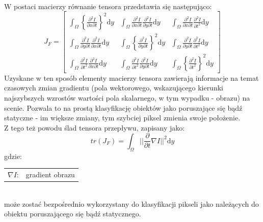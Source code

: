 \paragraph{}
W postaci macierzy równanie tensora przedstawia się następująco:
\begin{equation}
\label{eq:FT}
J_{F} =
\begin{bmatrix}
%
\int_\Omega \left\{\frac{\partial^2I}{\partial x\partial t}\right\}^2 \mathrm{d}y   &
%
\int_\Omega \frac{\partial^2I}{\partial x\partial t} \frac{\partial^2I}{\partial y\partial t} \mathrm{d}y  &
%
\int_\Omega \frac{\partial^2I}{\partial x\partial t} \frac{\partial^2I}{\partial t^2} \mathrm{d}y
\\[0.5em]
%
%
\int_\Omega \frac{\partial^2I}{\partial y\partial t} \frac{\partial^2I}{\partial x\partial t} \mathrm{d}y  &
%
\int_\Omega \left\{\frac{\partial^2I}{\partial y\partial t}\right\}^2 \mathrm{d}y   &
%
\int_\Omega \frac{\partial^2I}{\partial y\partial t} \frac{\partial^2I}{\partial t^2} \mathrm{d}y
\\[0.5em]
%
%
\int_\Omega \frac{\partial^2I}{\partial t^2} \frac{\partial^2I}{\partial x\partial t} \mathrm{d}y   &
%
\int_\Omega \frac{\partial^2I}{\partial t^2} \frac{\partial^2I}{\partial y\partial t} \mathrm{d}y   &
%
\int_\Omega \left\{\frac{\partial^2I}{\partial t^2}\right\}^2 \mathrm{d}y
\end{bmatrix}
\end{equation}
Uzyskane w ten sposób elementy macierzy tensora zawierają informacje na temat czasowych zmian gradientu (pola wektorowego, wskazującego kierunki najszybszych wzrostów wartości pola skalarnego, w tym wypadku - obrazu) na scenie. Pozwala to na prostą klasyfikację obiektów jako poruszające się bądź statyczne - im większe zmiany, tym szybciej piksel zmienia swoje położenie.\\
Z tego też powodu ślad tensora przepływu, zapisany jako:
\begin{equation}
tr(J_{F}) = 
\int_\Omega ||\frac{\partial}{\partial t}\nabla I||^2\mathrm{d}y
\end{equation}gdzie:\\ 
\hspace*{3em}
\begin{tabular}{r l}
$\nabla I$: &  gradient obrazu
\end{tabular} \\

może zostać bezpośrednio wykorzystany do klasyfikacji pikseli jako należących do obiektu poruszającego się bądź statycznego.
